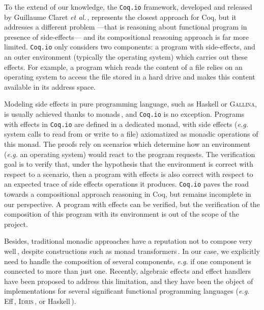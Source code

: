 To the extend of our knowledge, the \texttt{Coq.io} framework, developed and
released by Guillaume Claret \emph{et al.}\,\cite{claret2015coqiowww},
represents the closest approach for Coq, but it addresses a different problem
---that is reasoning about functional program in presence of side-effects--- and
its compositional reasoning approach is far more limited.
%
\texttt{Coq.io} only considers two components: a program with side-effects, and
an outer environment (typically the operating system) which carries out these
effects.
%
For example, a program which reads the content of a file relies on an operating
system to access the file stored in a hard drive and makes this content
available in its address space.

Modeling side effects in pure programming language, such as Haskell or {\scshape
  Gallina}, is usually achieved thanks to
monads\,\cite{wadler1990comprehending,jones2005io}, and \texttt{Coq.io} is no
exception.
%
Programs with effects in \texttt{Coq.io} are defined in a dedicated monad, with
side effects (\emph{e.g.}  system calls to read from or write to a file)
axiomatized as monadic operations of this monad.
%
The proofs rely on scenarios which determine how an environment (\emph{e.g.} an
operating system) would react to the program requests.
%
The verification goal is to verify that, under the hypothesis that the
environment is correct with respect to a scenario, then a program with effects
is also correct with respect to an expected trace of side effects operations it
produces.
%
\texttt{Coq.io} paves the road towards a compositional approach reasoning in
Coq, but remains incomplete in our perspective.
%
A program with effects can be verified, but the verification of the composition
of this program with its environment is out of the scope of the project.

Besides, traditional monadic approaches have a reputation not to compose very
well\,\cite{hyland2006combining}, despite constructions such as monad
transformers\,\cite{liang1995mtl}.
%
In our case, we explicitly need to handle the composition of several components,
\emph{e.g.} if one component is connected to more than just one.
%
Recently, algebraic effects and effect handlers\,\cite{bauer2015effects} have
been proposed to address this limitation, and they have been the object of
implementations for several significant functional programming languages
(\emph{e.g.}  Eff\,\cite{bauer2015effects}, {\scshape
  Idris}\,\cite{brady2013idris}, or Haskell\,\cite{kiselyov2013extensible}).

